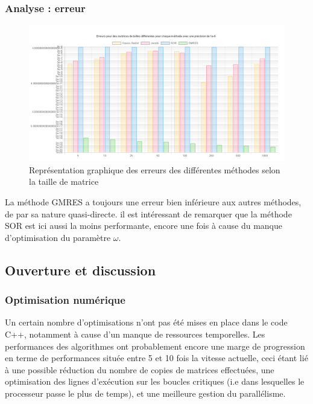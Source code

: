 \subsubsection{Analyse : erreur}
\begin{figure}[H]
	\includegraphics[width=\linewidth]{images/errors.PNG}
	\caption{Représentation graphique des erreurs des différentes méthodes selon la taille de matrice}
\end{figure}

La méthode GMRES a toujours une erreur bien inférieure aux autres méthodes, de par sa nature quasi-directe. il est intéressant de remarquer que la méthode SOR est ici aussi la moins performante, encore une fois à cause du manque d'optimisation du paramètre $\omega$.



\subsection{Ouverture et discussion}
\subsubsection{Optimisation numérique}
Un certain nombre d'optimisations n'ont pas été mises en place dans le code C++, notamment à cause d'un manque de ressources temporelles. Les performances des algorithmes ont probablement encore une marge de progression en terme de performances située entre 5 et 10 fois la vitesse actuelle, ceci étant lié à une possible réduction du nombre de copies de matrices effectuées, une optimisation des lignes d'exécution sur les boucles critiques (i.e dans lesquelles le processeur passe le plus de temps), et une meilleure gestion du parallélisme.


